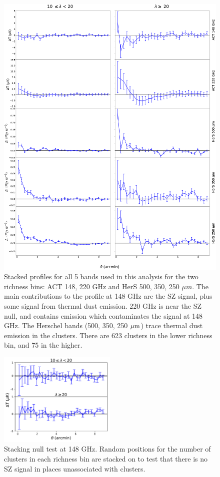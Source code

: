 \documentclass[a4paper,fleqn,usenatbib]{mnras}
\begin{document}
\begin{figure}
  \centering
  \includegraphics[height=0.9 \textheight]{5panel_rawprofs_all_stacks_all_ncut.pdf}

\caption{Stacked profiles for all 5 bands used in this analysis for the two richness bins: ACT 148, 220 GHz and HerS 500, 350, 250 $\mu m$. The main contributions to the profile at 148 GHz are the SZ signal, plus some signal from thermal dust emission. 220 GHz is near the SZ null, and contains emission which contaminates the signal at 148 GHz. The Herschel bands (500, 350, 250 $\rm \mu m$) trace thermal dust emission in the clusters. There are 623 clusters in the lower richness bin, and 75 in the higher.}  
  \label{fig:rawstacks}
\end{figure}

\begin{figure}
  \centering
  \includegraphics[width=0.5\textwidth]{rand_stacks_tophat.pdf}

\caption{Stacking null test at 148 GHz. Random positions for the number of clusters in each richness bin are stacked on to test that there is no SZ signal in places unassociated with clusters.}  
  \label{fig:randstacks}
\end{figure}
\end{document}
